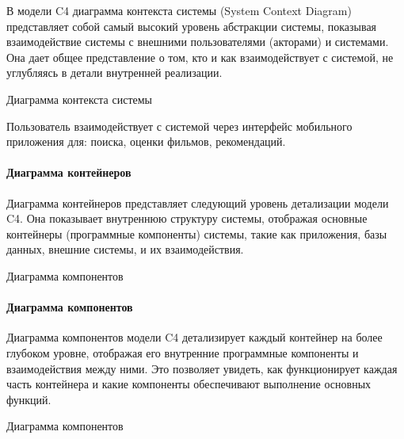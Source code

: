 В модели C4 диаграмма контекста системы (System Context Diagram)
представляет собой самый высокий уровень абстракции системы,
показывая взаимодействие системы с внешними пользователями (акторами)
и системами. Она дает общее представление о том,
кто и как взаимодействует с системой,
не углубляясь в детали внутренней реализации.

\begin{image}
	\caption{Диаграмма контекста системы}
	\label{fig:c4:system:context4}
\end{image}

\clearpage

Пользователь взаимодействует с системой через интерфейс мобильного приложения для: поиска, оценки фильмов, рекомендаций.\par


\paragraph{Диаграмма контейнеров}

Диаграмма контейнеров представляет следующий уровень детализации модели C4.
Она показывает внутреннюю структуру системы,
отображая основные контейнеры (программные компоненты) системы,
такие как приложения, базы данных, внешние системы, и их взаимодействия.

\begin{image}
	\caption{Диаграмма компонентов}
	\label{fig:c4:container5}
\end{image}

\clearpage

\paragraph{Диаграмма компонентов}

Диаграмма компонентов модели C4 детализирует
каждый контейнер на более глубоком уровне,
отображая его внутренние программные компоненты и взаимодействия между ними.
Это позволяет увидеть, как функционирует каждая часть контейнера
и какие компоненты обеспечивают выполнение основных функций.

\begin{image}
	\caption{Диаграмма компонентов}
	\label{fig:c4:components6}
\end{image}

\clearpage


